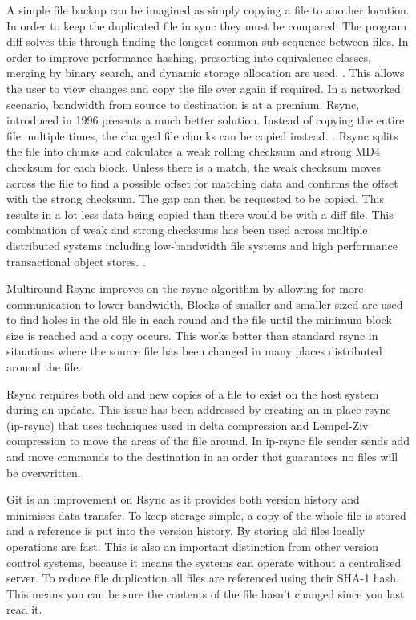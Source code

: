 \documentclass[a4paper,10pt]{article}
\begin{document}
A simple file backup can be imagined as simply copying a file to another location. In order to keep the duplicated file in sync they must be compared. The program diff solves this through finding the longest common sub-sequence between files. In order to improve performance hashing, presorting into equivalence classes, merging by binary search, and dynamic storage allocation are used. \cite{hunt1976algorithm}. This allows the user to view changes and copy the file over again if required.
In a networked scenario, bandwidth from source to destination is at a premium. Rsync, introduced in 1996 presents a much better solution. Instead of copying the entire file multiple times, the changed file chunks can be copied instead. \cite{tridgell1996rsync}. Rsync splits the file into chunks and calculates a weak rolling checksum and strong MD4 checksum for each block. Unless there is a match, the weak checksum moves across the file to find a possible offset for matching data and confirms the offset with the strong checksum. The gap can then be requested to be copied. This results in a lot less data being copied than there would be with a diff file. \cite{tridgell1996rsync} This combination of weak and strong checksums has been used across multiple distributed systems including low-bandwidth file systems \cite{muthitacharoen2001low} and high performance transactional object stores. \cite{stephen2000platypus}.

Multiround Rsync improves on the rsync algorithm by allowing for more communication to lower bandwidth. Blocks of smaller and smaller sized are used to find holes in the old file in each round and the file until the minimum block size is reached and a copy occurs. \cite{multiroundrsync} This works better than standard rsync in situations where the source file has been changed in many places distributed around the file.

Rsync requires both old and new copies of a file to exist on the host system during an update. This issue has been addressed by creating an in-place rsync (ip-rsync) that uses techniques used in delta compression and Lempel-Ziv compression to move the areas of the file around. In ip-rsync file sender sends add and move commands to the destination in an order that guarantees no files will be overwritten. \cite{rasch2003place}

Git is an improvement on Rsync as it provides both version history and minimises data transfer. To keep storage simple, a copy of the whole file is stored and a reference is put into the version history. By storing old files locally operations are fast. This is also an important distinction from other version control systems, because it means the systems can operate without a centralised server. To reduce file duplication all files are referenced using their SHA-1 hash. This means you can be sure the contents of the file hasn’t changed since you last read it.
\end{document}
